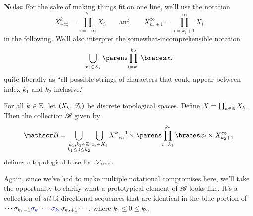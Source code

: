 \documentclass{fkpaper}
\begin{document}
\begin{multicols}{2}
\textbf{Note:} For the sake of making things fit on one line, we'll
use the notation
\[
  X_{-\infty}^{k_1} = \prod_{i=-\infty}^{k_1}X_i
  \qquad\text{and}\qquad
  X_{k_2+1}^{\infty} = \prod_{i=k_2+1}^{\infty}X_i
\]
in the following. We'll also interpret the somewhat-incomprehensible
notation
\[
  \bigcup_{x_i \in X_i} \pn{\prod_{i = k_1}^{k_2} \set{x_i}}
\]
quite liberally as ``all possible strings of characters that could
appear between index $k_1$ and $k_2$ inclusive.''
\begin{proposition}\label{prop:prefix-basis}
  For all $k \in \mathbb{Z}$, let $(X_k, {\mathscr{T}}_k)$ be discrete topological
  spaces. Define $X = \prod_{k\in\mathbb{Z}} X_k$.%
  Then the collection ${\mathscr{B}}$ given by
  \[
    \ms B = \bigcup_{\substack{k_1, k_2 \in \ZZ \\ k_1 \leq 0 \leq k_2}}
    \bigcup_{x_i \in X_i} X_{-\infty}^{k_1-1} \times
    \pn{\prod_{i = k_1}^{k_2} \set{x_i}}
    \times X_{k_2+1}^\infty
  \]
  defines a topological base for ${\mathscr{T}}_{\rm prod}$.
\end{proposition}
Again, since we've had to make multiple notational compromises here,
we'll take the opportunity to clarify what a prototypical element of
${\mathscr{B}}$ looks like. It's a collection of \emph{all} bi-directional
sequences that are identical in the {\color{blue} blue} portion of
$\cdots \sigma_{k_1-1} {\color{blue} \sigma_{k_1} \cdots \sigma_{k_2}}
\sigma_{k_2+1} \cdots$, where $k_1 \leq 0 \leq k_2$.


\end{multicols}
\end{document}

